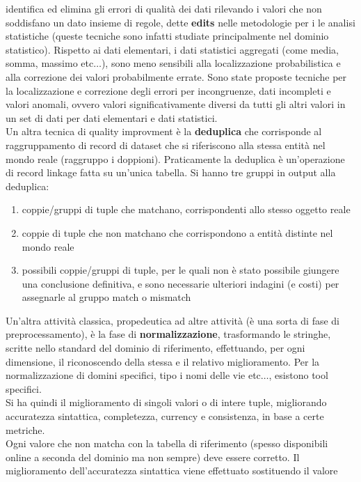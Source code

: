 \documentclass[a4paper,12pt, oneside]{book}
\begin{document}
identifica ed elimina gli errori di qualità dei dati rilevando i valori che non
soddisfano un dato insieme di regole, dette \textbf{edits} nelle metodologie per
i le analisi statistiche (queste tecniche sono infatti studiate principalmente
nel dominio statistico). Rispetto ai dati elementari, i dati statistici
aggregati (come media, somma, massimo etc$\ldots$), sono meno sensibili alla
localizzazione probabilistica e alla correzione dei valori probabilmente
errate. Sono state proposte tecniche per la localizzazione e correzione degli
errori per incongruenze, dati incompleti e valori anomali, ovvero valori
significativamente diversi da tutti gli altri valori in un set di dati per dati
elementari e dati statistici.\\
Un altra tecnica di quality improvment è la \textbf{deduplica} che corrisponde
al raggruppamento di record di dataset che si riferiscono alla stessa entità nel
mondo reale (raggruppo i doppioni). Praticamente la deduplica è un'operazione di
record linkage fatta su un'unica tabella. Si hanno tre gruppi in output alla
deduplica:
\begin{enumerate}
  \item coppie/gruppi di tuple che matchano, corrispondenti allo stesso
  oggetto reale
  \item coppie di tuple che non matchano che corrispondono a entità distinte nel
  mondo reale 
  \item possibili coppie/gruppi di tuple, per le quali non è stato possibile
  giungere una conclusione definitiva, e sono necessarie ulteriori indagini (e
  costi) per assegnarle al gruppo match o mismatch
\end{enumerate}
Un'altra attività classica, propedeutica ad altre attività (è una sorta di fase
di preprocessamento), è la fase di
\textbf{normalizzazione}, trasformando le stringhe, scritte nello standard del
dominio di riferimento, effettuando, per ogni dimensione, il riconoscendo della
stessa e il relativo miglioramento. Per la normalizzazione di domini specifici,
tipo i nomi delle vie etc$\ldots$, esistono tool specifici.\\
Si ha quindi il miglioramento di singoli valori o di intere tuple, migliorando
accuratezza sintattica, completezza, currency e consistenza, in base a certe
metriche. \\
Ogni valore che non matcha con la tabella di riferimento (spesso disponibili
online a seconda del dominio ma non sempre) deve essere corretto. Il
miglioramento dell'accuratezza sintattica viene effettuato sostituendo il valore
\end{document}
